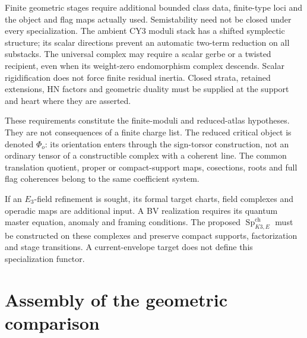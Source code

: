 Finite geometric stages require additional bounded class data,
finite-type loci and the object and flag maps actually used.
Semistability need not be closed under every specialization.
The ambient CY3 moduli stack has a shifted symplectic structure;
its scalar directions prevent an automatic two-term reduction on
all substacks. The universal complex may require a scalar gerbe
or a twisted recipient, even when its weight-zero endomorphism
complex descends. Scalar rigidification does not force finite
residual inertia. Closed strata, retained extensions, HN factors
and geometric duality must be supplied at the support and heart
where they are asserted.

These requirements constitute the finite-moduli and reduced-atlas
hypotheses. They are not consequences of a finite charge list.
The reduced critical object is denoted \(\Phi_o\): its
orientation enters through the sign-torsor construction, not an
ordinary tensor of a constructible complex with a coherent line.
The common translation quotient, proper or compact-support maps,
cosections, roots and full flag coherences belong to the same
coefficient system.

If an \(E_3\)-field refinement is sought, its formal target
charts, field complexes and operadic maps are additional input.
A BV realization requires its quantum master equation, anomaly
and framing conditions. The proposed
\(\operatorname{Sp}^{\mathrm{ch}}_{K3,E}\) must be constructed
on these complexes and preserve compact supports, factorization
and stage transitions. A current-envelope target does not define
this specialization functor.

















\section{Assembly of the geometric comparison}

